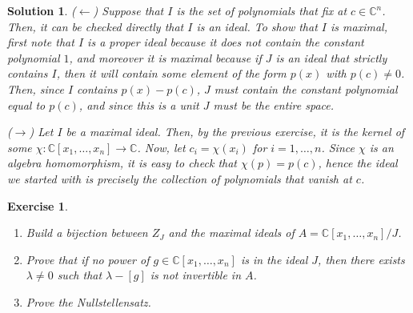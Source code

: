\documentclass{article}
\newtheorem{ex}{Exercise}
\theoremstyle{nonumberplain}
\newtheorem{sol}{Solution}
\newcommand{\C}{\mathbb{C}}
\begin{document}
\begin{sol}
($\leftarrow$) Suppose that $I$ is the set of polynomials that fix at $c \in \C^n$. Then, it can be checked directly that $I$ is an ideal. To show that $I$ is maximal, first note that $I$ is a proper ideal because it does not contain the constant polynomial $1$, and moreover it is maximal because if $J$ is an ideal that strictly contains $I$, then it will contain some element of the form $p(x)$ with $p(c) \neq 0$. Then, since $I$ contains $p(x)-p(c)$, $J$ must contain the constant polynomial equal to $p(c)$, and since this is a unit $J$ must be the entire space.

\medskip

($\rightarrow$) Let $I$ be a maximal ideal. Then, by the previous exercise, it is the kernel of some $\chi \colon \C[x_1, \dots, x_n] \to \C$. Now, let $c_i = \chi(x_i)$ for $i = 1, \dots, n$. Since $\chi$ is an algebra homomorphism, it is easy to check that $\chi(p) = p(c)$, hence the ideal we started with is precisely the collection of polynomials that vanish at $c$.
\end{sol}

\begin{ex}
\leavevmode
\begin{enumerate}[label={(\arabic*)}]
\item Build a bijection between $Z_J$ and the maximal ideals of $A = \C[x_1, \dots, x_n]/J$.
\addtocounter{enumi}{1}
\item Prove that if no power of $g \in \C[x_1, \dots, x_n]$ is in the ideal $J$, then there exists $\lambda \neq 0$ such that $\lambda - [g]$ is not invertible in $A$.
\item Prove the Nullstellensatz.
\end{enumerate}
\end{ex}
\end{document}
